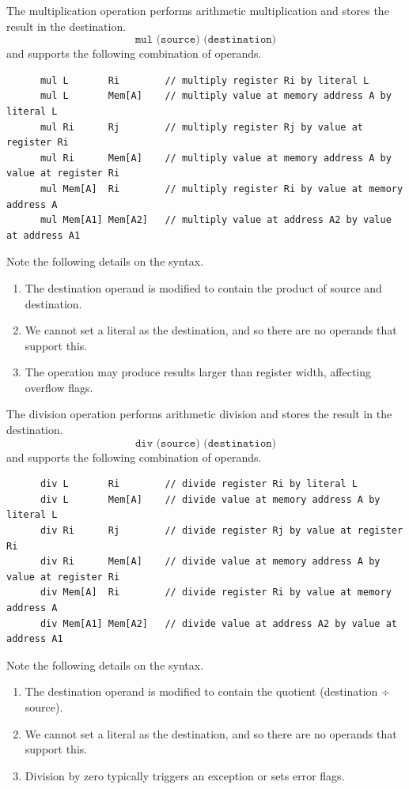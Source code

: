   \begin{definition}[Multiplication]
    \label{def:multiplication}
    The multiplication operation performs arithmetic multiplication and stores the result in the destination.
    \begin{equation}
      \texttt{mul (source) (destination)}
    \end{equation}
    and supports the following combination of operands.
    \begin{lstlisting}
      mul L       Ri        // multiply register Ri by literal L
      mul L       Mem[A]    // multiply value at memory address A by literal L
      mul Ri      Rj        // multiply register Rj by value at register Ri
      mul Ri      Mem[A]    // multiply value at memory address A by value at register Ri
      mul Mem[A]  Ri        // multiply register Ri by value at memory address A
      mul Mem[A1] Mem[A2]   // multiply value at address A2 by value at address A1
    \end{lstlisting}
    Note the following details on the syntax.
    \begin{enumerate}
      \item The destination operand is modified to contain the product of source and destination.
      \item We cannot set a literal as the destination, and so there are no operands that support this.
      \item The operation may produce results larger than register width, affecting overflow flags.
    \end{enumerate}
  \end{definition}

  \begin{definition}[Division]
    \label{def:division}
    The division operation performs arithmetic division and stores the result in the destination.
    \begin{equation}
      \texttt{div (source) (destination)}
    \end{equation}
    and supports the following combination of operands.
    \begin{lstlisting}
      div L       Ri        // divide register Ri by literal L
      div L       Mem[A]    // divide value at memory address A by literal L
      div Ri      Rj        // divide register Rj by value at register Ri
      div Ri      Mem[A]    // divide value at memory address A by value at register Ri
      div Mem[A]  Ri        // divide register Ri by value at memory address A
      div Mem[A1] Mem[A2]   // divide value at address A2 by value at address A1
    \end{lstlisting}
    Note the following details on the syntax.
    \begin{enumerate}
      \item The destination operand is modified to contain the quotient (destination ÷ source).
      \item We cannot set a literal as the destination, and so there are no operands that support this.
      \item Division by zero typically triggers an exception or sets error flags.
    \end{enumerate}
  \end{definition}

